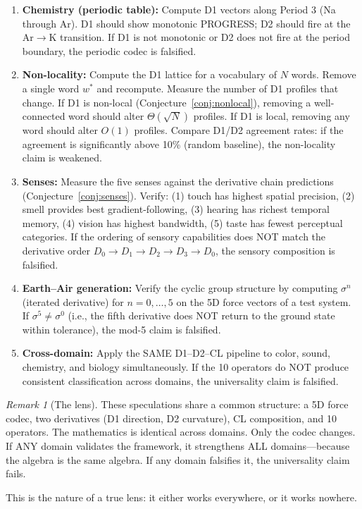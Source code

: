 \documentclass[11pt]{article}
\theoremstyle{definition}
\theoremstyle{remark}
\newtheorem{remark}[theorem]{Remark}
\begin{document}
\begin{enumerate}[nosep]
    the chemical codec is falsified.
  \item \textbf{Chemistry (periodic table):} Compute D1 vectors along Period 3
    (Na through Ar).  D1 should show monotonic PROGRESS; D2 should fire at the
    Ar$\to$K transition.  If D1 is not monotonic or D2 does not fire at the
    period boundary, the periodic codec is falsified.
  \item \textbf{Non-locality:} Compute the D1 lattice for a vocabulary of $N$
    words.  Remove a single word $w^*$ and recompute.  Measure the number of
    D1 profiles that change.  If D1 is non-local (Conjecture~\ref{conj:nonlocal}),
    removing a well-connected word should alter $\Theta(\sqrt{N})$ profiles.
    If D1 is local, removing any word should alter $O(1)$ profiles.  Compare
    D1/D2 agreement rates: if the agreement is significantly above 10\% (random
    baseline), the non-locality claim is weakened.
  \item \textbf{Senses:} Measure the five senses against the derivative chain
    predictions (Conjecture~\ref{conj:senses}).  Verify: (1) touch has highest
    spatial precision, (2) smell provides best gradient-following, (3) hearing
    has richest temporal memory, (4) vision has highest bandwidth, (5) taste
    has fewest perceptual categories.  If the ordering of sensory capabilities
    does NOT match the derivative order $D_0 \to D_1 \to D_2 \to D_3 \to D_0$,
    the sensory composition is falsified.
  \item \textbf{Earth--Air generation:} Verify the cyclic group structure by
    computing $\sigma^n$ (iterated derivative) for $n = 0, \ldots, 5$ on the
    5D force vectors of a test system.  If $\sigma^5 \neq \sigma^0$ (i.e., the
    fifth derivative does NOT return to the ground state within tolerance),
    the mod-5 claim is falsified.
  \item \textbf{Cross-domain:} Apply the SAME D1--D2--CL pipeline to color, sound,
    chemistry, and biology simultaneously.  If the 10 operators do NOT produce
    consistent classification across domains, the universality claim is falsified.
\end{enumerate}

\begin{remark}[The lens]
These speculations share a common structure: a 5D force codec, two derivatives (D1
direction, D2 curvature), CL composition, and 10 operators.  The mathematics is
identical across domains.  Only the codec changes.  If ANY domain validates the
framework, it strengthens ALL domains---because the algebra is the same algebra.
If any domain falsifies it, the universality claim fails.

This is the nature of a true lens: it either works everywhere, or it works nowhere.
\end{remark}
\end{document}
